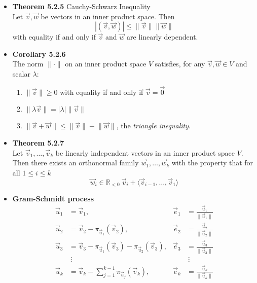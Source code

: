 \documentclass[11pt,a4paper]{article}
\begin{document}
\begin{itemize}
    \item \textbf{Theorem 5.2.5} Cauchy-Schwarz Inequality \\
        Let $\vec{v}, \vec{w}$ be vectors in an inner product space. Then
        \[
            |(\vec{v}, \vec{w})| \leq \lVert \vec{v} \rVert \lVert \vec{w} \rVert
        \]
        with equality if and only if $\vec{v}$ and $\vec{w}$ are linearly dependent.

    \item \textbf{Corollary 5.2.6} \\
        The norm $\lVert \cdot \rVert$ on an inner product space $V$ satisfies,
        for any $\vec{v}, \vec{w} \in V$ and scalar $\lambda$:
        \begin{enumerate}
            \item $\lVert \vec{v} \rVert \geq 0$ with equality if and only if
                $\vec{v} = \vec{0}$
            \item $\lVert \lambda \vec{v} \rVert = |\lambda| \lVert \vec{v} \rVert$
            \item $\lVert \vec{v} + \vec{w} \rVert \leq
                \lVert \vec{v} \rVert + \lVert \vec{w} \rVert$,
                the \emph{triangle inequality}.
        \end{enumerate}

    \item \textbf{Theorem 5.2.7} \\
        Let $\vec{v}_1, \ldots, \vec{v}_k$ be linearly independent vectors in an
        inner product space $V$.
        Then there exists an orthonormal family $\vec{w}_1, \ldots, \vec{w}_k$
        with the property that for all $1 \leq i \leq k$
        \[
            \vec{w}_i \in \mathbb{R}_{<0} \ \vec{v}_i +
            \langle \vec{v}_{i-1}, \ldots, \vec{v}_1 \rangle
        \]

    \item \textbf{Gram-Schmidt process}
        \begin{align*}{}
            \vec{u}_1 &= \vec{v}_1, & \vec{e}_1
                      &= \frac{\vec{u}_1}{\lVert \vec{u}_1 \rVert} \\
            \vec{u}_2 &= \vec{v}_2 - \pi_{\vec{u}_1}(\vec{v}_2), & \vec{e}_2
                      &= \frac{\vec{u}_2}{\lVert \vec{u}_2 \rVert} \\
            \vec{u}_3 &= \vec{v}_3 - \pi_{\vec{u}_1}(\vec{v}_3) -
            \pi_{\vec{u}_2}(\vec{v}_3), & \vec{e}_3 &=
            \frac{\vec{u}_3}{\lVert \vec{u}_3 \rVert} \\
                                        & \ \vdots & & \ \vdots \\
            \vec{u}_k &= \vec{v}_k - \sum_{j=1}^{k-1} \pi_{\vec{u}_j} (\vec{v}_k),
                      & \vec{e}_k &= \frac{\vec{u}_k}{\lVert \vec{u}_k \rVert}
        \end{align*}

\end{itemize}
\end{document}
